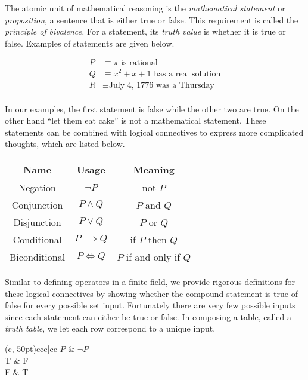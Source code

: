 \documentclass[twoside]{report}
\begin{document}
The atomic unit of mathematical reasoning is the \emph{mathematical statement} or \emph{proposition}, a sentence that is either true or false. This requirement is called the \emph{principle of bivalence.} For a statement, its \emph{truth value} is whether it is true or false. Examples of statements are given below.

\begin{align*}
	P &\equiv \text{$\pi$ is rational} \\
	Q &\equiv \text{$x^2 + x + 1$ has a real solution} \\
	R &\equiv \text{July 4, 1776 was a Thursday} \\
\end{align*}
 
In our examples, the first statement is false while the other two are true. On the other hand ``let them eat cake'' is not a mathematical statement. These statements can be combined with logical connectives to express more complicated thoughts, which are listed below.

\vspace{\baselineskip}
\begin{center}
	\begin{tabular}{ccc}
		\toprule
		Name & Usage & Meaning \\
		\midrule
		Negation & $\neg P$ & not $P$ \\
		Conjunction & $P \wedge Q$ & $P$ and $Q$ \\
		Disjunction & $P \lor Q$ & $P$ or $Q$ \\
		Conditional & $P \implies Q$ & if $P$ then $Q$ \\
		Biconditional & $P \iff Q$ & $P$ if and only if $Q$ \\
		\bottomrule
	\end{tabular}
\end{center} 
\vspace{\baselineskip}

Similar to defining operators in a finite field, we provide rigorous definitions for these logical connectives by showing whether the compound statement is true of false for every possible set input. Fortunately there are very few possible inputs since each statement can either be true or false. In composing a table, called a \emph{truth table}, we let each row correspond to a unique input.

\vspace{\baselineskip}
\begin{center}
	\begin{TAB}(c, 50pt){cc}{c|cc}
		$P$ & $\neg P$ \\
		T & F \\
		F & T \\
	\end{TAB}
\end{center}
\vspace{\baselineskip}
\end{document}
